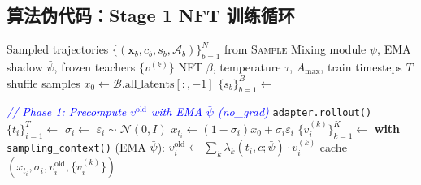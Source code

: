 \documentclass[11pt,a4paper]{article}
\newcommand{\N}{\mathcal{N}}
\newcommand{\adv}{\mathcal{A}}
\theoremstyle{definition}
\begin{document}
\subsection{算法伪代码：Stage 1 NFT 训练循环}

\begin{algorithm}[H]
\caption{MoF-NFT Optimization (\texttt{trainers/mof/nft.py:optimize})}
\label{alg:nft}
\begin{algorithmic}[1]
\Require Sampled trajectories $\{(\mathbf{x}_b, c_b, s_b, \adv_b)\}_{b=1}^N$ from \textsc{Sample}
\Require Mixing module $\psi$, EMA shadow $\bar\psi$, frozen teachers $\{v^{(k)}\}$
\Require NFT $\beta$, temperature $\tau$, $A_{\max}$, train timesteps $T$
\Statex
{}
  \State shuffle samples
    \State $x_0 \gets \mathcal{B}.\text{all\_latents}[:, -1]$ 
    \State $\{s_b\}_{b=1}^B \gets$ 

    \Statex \quad\textcolor{blue}{\textit{// Phase 1: Precompute $v^{\text{old}}$ with EMA $\bar\psi$ (no\_grad)}}
    \State \texttt{adapter.rollout()}
    \State $\{t_i\}_{i=1}^T \gets$  
      \State $\sigma_i \gets$ 
      \State $\varepsilon_i \sim \N(0, I)$
      \State $x_{t_i} \gets (1 - \sigma_i) x_0 + \sigma_i \varepsilon_i$ 
      \State $\{v^{(k)}_i\}_{k=1}^K \gets$ 
      \State \textbf{with} \texttt{sampling\_context()} (EMA $\bar\psi$):
        $v^{\text{old}}_i \gets \sum_k \lambda_k(t_i, c; \bar\psi) \cdot v^{(k)}_i$
      \State cache $(x_{t_i}, \sigma_i, v^{\text{old}}_i, \{v^{(k)}_i\})$
    \EndFor


\end{algorithmic}
\end{algorithm}
\end{document}
